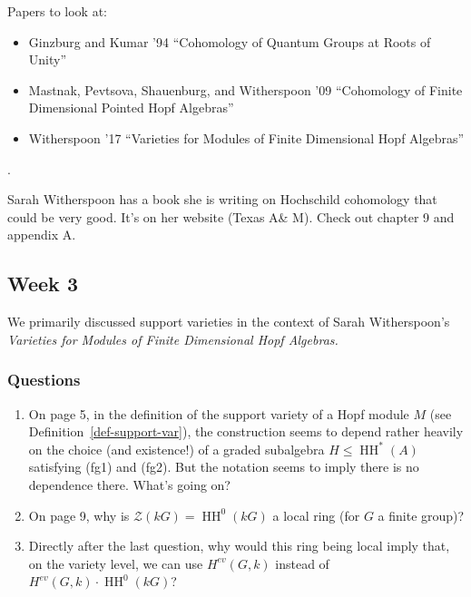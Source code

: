 \documentclass[12pt]{article}
\theoremstyle{nonumberbreak}
\theoremstyle{changebreak}
\theoremstyle{nonumberplain}
\theoremstyle{change}
\DeclareMathOperator{\HH}{HH}
\begin{document}
Papers to look at: 
\begin{itemize}
	\item Ginzburg and Kumar '94 ``Cohomology of Quantum Groups at Roots of Unity''
	\item Mastnak, Pevtsova, Shauenburg, and Witherspoon '09 ``Cohomology of Finite Dimensional Pointed Hopf Algebras''
	\item Witherspoon '17 ``Varieties for Modules of Finite Dimensional Hopf Algebras''
\end{itemize}. 

Sarah Witherspoon has a book she is writing on Hochschild cohomology that could be very good. It's on her website (Texas A\& M). Check out chapter 9 and appendix A.

\subsection{Week 3}
We primarily discussed support varieties in the context of Sarah Witherspoon's \textit{Varieties for Modules of Finite Dimensional Hopf Algebras.}

\subsubsection{Questions}
\begin{enumerate}
	\item On page 5, in the definition of the support variety of a Hopf module $M$ (see Definition~\ref{def-support-var}),
	the construction seems to depend rather heavily on the choice (and existence!) of a graded subalgebra $H\le \HH^*(A)$
	satisfying (fg1) and (fg2). But the notation seems to imply there is no dependence there. What's going on?
	\item On page 9, why is $\mathcal{Z}(kG)=\HH^0(kG)$ a local ring (for $G$ a finite group)?
	\item Directly after the last question, why would this ring being local imply that, on the variety level,
	we can use $H^{ev}(G,k)$ instead of $H^{ev}(G,k)\cdot \HH^0(kG)$?
\end{enumerate}
\end{document}
